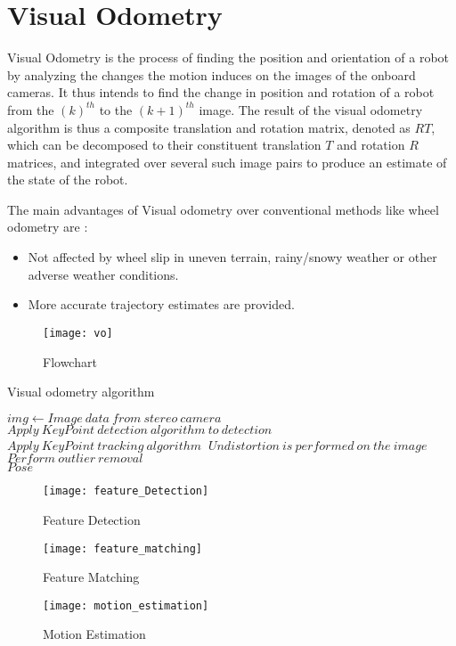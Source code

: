 \section{Visual Odometry}

Visual Odometry is the process of finding the position and orientation of a robot by analyzing the changes the motion induces on the images of the onboard cameras. It thus intends to find the change in position and rotation of a robot from the \((k)^{th}\) to the \((k+1)^{th}\) image. The result of the visual odometry algorithm is thus a composite translation and rotation matrix, denoted as \(RT\), which can be decomposed to their constituent translation \(T\) and rotation \(R\) matrices, and integrated over several such image pairs to produce an estimate of the state of the robot.

The main advantages of Visual odometry over conventional methods like wheel odometry are :

\begin{itemize}
  \item Not affected by wheel slip in uneven terrain, rainy/snowy weather or other adverse weather conditions.
  \item More accurate trajectory estimates are provided.
\end{itemize}


\begin{figure}[H]
    \centering
    \texttt{[image: vo]}
    \caption{Flowchart}
    \label{fig:Visual Odometry}
\end{figure}

\begin{algorithm}[hbt!]
    \caption{Visual odometry algorithm}\label{alg:cap}
    
    \begin{algorithmic}[1]
    
        \Require $img \gets Image\ data\ from\ stereo\ camera$
        \State $Apply\ KeyPoint\ detection\ algorithm\ to\ detection\ $
        \State $Apply\ KeyPoint\ tracking\ algorithm\ $
        \State $Undistortion\ is\ performed\ on\ the\ image\ $
        \State $Perform\ outlier\ removal\ $
        \\
        \Return $Pose$
        
    \end{algorithmic}
\end{algorithm}

\begin{figure}[H]
  \centering
    \begin{multicols}{2}
        \texttt{[image: feature\_Detection]}
        \caption{Feature Detection}
        \label{fig:Feature Detection}
        
        \texttt{[image: feature\_matching]}
        \caption{Feature Matching}
        \label{fig:Feature Matching}
    \end{multicols} 
    
    \texttt{[image: motion\_estimation]}
        \caption{Motion Estimation}
        \label{fig:Motion Estimation}
    
\end{figure}

 